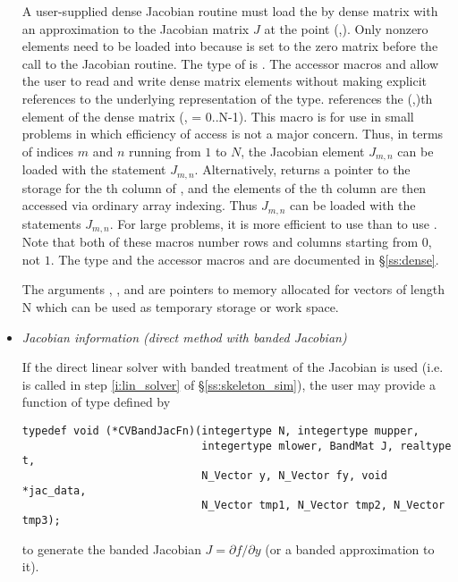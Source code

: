 \begin{itemize}
  A user-supplied dense Jacobian routine must load the  by 
  dense matrix  with an approximation to the Jacobian matrix $J$
  at the point (,).  Only nonzero elements need to be loaded
  into  because  is set to the zero matrix before the call
  to the Jacobian routine. The type of  is . The
  accessor macros  and  allow the user to
  read and write dense matrix elements without making explicit
  references to the underlying representation of the 
  type.  references the (,)th
  element of the dense matrix  (, = 0..N-1). This macro
  is for use in small problems in which efficiency of access is not a major
  concern.  Thus, in terms of indices $m$ and $n$ running from $1$ to
  $N$, the Jacobian element $J_{m,n}$ can be loaded with the statement
   $J_{m,n}$.  Alternatively,
   returns a pointer to the storage for
  the th column of , and the elements of the th column
  are then accessed via ordinary array indexing.  Thus $J_{m,n}$ can be 
  loaded with the statements 
   $J_{m,n}$.  For large problems, it is more 
  efficient to use  than to use . 
  Note that both of these macros number rows and columns
  starting from $0$, not $1$.  The  type and the accessor
  macros  and  are documented in
  \S\ref{ss:dense}.
  
  The arguments , , and  are pointers to 
  memory allocated for vectors of length N which can be used 
  as temporary storage or work space.
%
%
\item {\em Jacobian information (direct method with banded Jacobian)}
  \label{p:bjac}
  
  If the direct linear solver with banded treatment of the Jacobian is used 
  (i.e.  is called in step \ref{i:lin_solver} of \S\ref{ss:skeleton_sim}), 
  the user may provide a function of type  defined by
\begin{verbatim}
typedef void (*CVBandJacFn)(integertype N, integertype mupper, 
                            integertype mlower, BandMat J, realtype t, 
                            N_Vector y, N_Vector fy, void *jac_data,
                            N_Vector tmp1, N_Vector tmp2, N_Vector tmp3);
\end{verbatim}
  to generate the banded Jacobian $J = \partial f / \partial y$ 
  (or a banded approximation to it).
  

\end{itemize}
